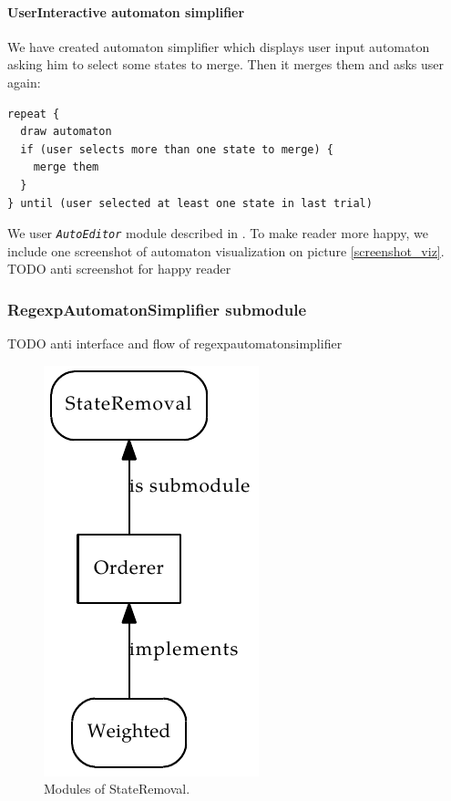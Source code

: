 \documentclass[a4paper,10pt,oneside]{article}
\newcommand{\myscale}{0.74}
\newcommand{\jmodule}[1]{\texttt{\textit{#1}}}
\begin{document}
\paragraph{UserInteractive automaton simplifier}
We have created automaton simplifier which displays user input automaton asking him to select some states to merge.
Then it merges them and asks user again:
\begin{verbatim}
repeat {
  draw automaton
  if (user selects more than one state to merge) {
    merge them
  }
} until (user selected at least one state in last trial)
\end{verbatim}
We user \jmodule{AutoEditor} module described in \cite{autoeditordoc}.
To make reader more happy, we include one screenshot of automaton visualization on picture \ref{screenshot_viz}.
TODO anti screenshot for happy reader

\subsubsection{RegexpAutomatonSimplifier submodule}
TODO anti interface and flow of regexpautomatonsimplifier

\begin{figure}
	\centering\includegraphics[scale=\myscale]{state_removal_modules}
	\caption{Modules of StateRemoval.} \label{state_removal_modules}
\end{figure}
\end{document}
